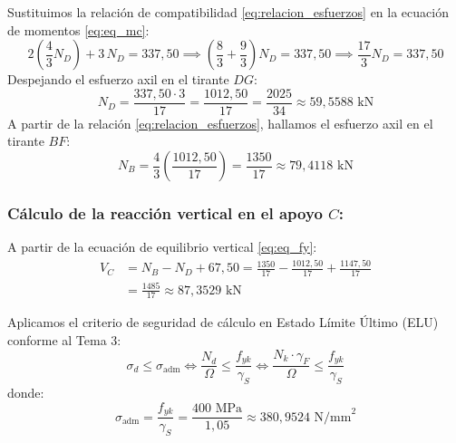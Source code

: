 Sustituimos la relación de compatibilidad \eqref{eq:relacion_esfuerzos} en la ecuación de momentos \eqref{eq:eq_mc}:
\begin{equation}
    2 \left(\frac{4}{3}N_D\right) + 3\,N_D = 337{,}50 \implies \left(\frac{8}{3} + \frac{9}{3}\right) N_D = 337{,}50 \implies \frac{17}{3} N_D = 337{,}50
\end{equation}
Despejando el esfuerzo axil en el tirante $DG$:
\begin{equation}
    N_D = \frac{337{,}50 \cdot 3}{17} = \frac{1012{,}50}{17} = \frac{2025}{34} \approx \boxed{59{,}5588\text{ kN}}
\end{equation}
A partir de la relación \eqref{eq:relacion_esfuerzos}, hallamos el esfuerzo axil en el tirante $BF$:
\begin{equation}
    N_B = \frac{4}{3} \left( \frac{1012{,}50}{17} \right) = \frac{1350}{17} \approx \boxed{79{,}4118\text{ kN}}
\end{equation}

\subsubsection*{Cálculo de la reacción vertical en el apoyo $C$:}
A partir de la ecuación de equilibrio vertical \eqref{eq:eq_fy}:
\begin{align}
    V_C & = N_B - N_D + 67{,}50 = \frac{1350}{17} - \frac{1012{,}50}{17} + \frac{1147{,}50}{17} \nonumber \\
        & = \frac{1485}{17} \approx \boxed{87{,}3529\text{ kN}}
\end{align}



Aplicamos el criterio de seguridad de cálculo en Estado Límite Último (ELU) conforme al Tema 3:
\begin{equation}
    \sigma_d \leq \sigma_{\text{adm}} \iff \frac{N_d}{\Omega} \leq \frac{f_{yk}}{\gamma_S} \iff \frac{N_k \cdot \gamma_F}{\Omega} \leq \frac{f_{yk}}{\gamma_S}
\end{equation}
donde:
\begin{equation}
    \sigma_{\text{adm}} = \frac{f_{yk}}{\gamma_S} = \frac{400\text{ MPa}}{1{,}05} \approx 380{,}9524\text{ N/mm}^2
\end{equation}

